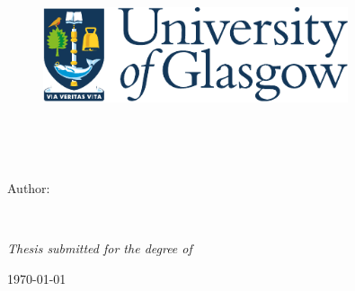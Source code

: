 
\begin{titlepage}
\begin{center}


\begin{figure}
    \begin{center}
    \includegraphics[width=0.8\textwidth]{Figures/logo.pdf}
    \end{center}
\end{figure}

\HRule \\[0.4cm] %
{\Large \bfseries \ttitle\par}\vspace{0.4cm} %
\HRule \\[1.5cm] %
    
\begin{minipage}[t]{1.0\textwidth}
\begin{flushleft} \large
Author: \authorname\\[2cm]
\end{flushleft}
\end{minipage}\\[1cm]
    
\vfill

\large \textit{Thesis submitted for the degree of \degreename}\\[2cm]

\deptname
    
\vfill

{\large \today}\\[4cm] %
    
\vfill
\end{center}
\end{titlepage}

